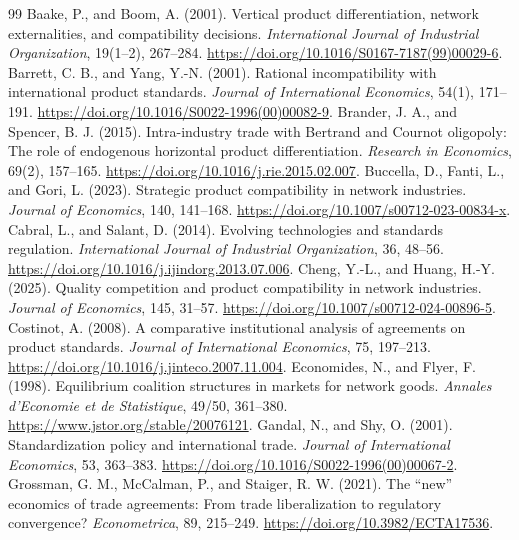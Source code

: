 \documentclass[11pt,a4paper]{article}
\theoremstyle{remark}\newtheorem{remark}[theorem]{Remark}
\begin{document}
\begin{thebibliography}{99}\footnotesize\setlength{\itemsep}{1pt}
 Baake, P., and Boom, A. (2001). Vertical product differentiation, network externalities, and compatibility decisions. \emph{International Journal of Industrial Organization}, 19(1--2), 267--284. \url{https://doi.org/10.1016/S0167-7187(99)00029-6}.
 Barrett, C. B., and Yang, Y.-N. (2001). Rational incompatibility with international product standards. \emph{Journal of International Economics}, 54(1), 171--191. \url{https://doi.org/10.1016/S0022-1996(00)00082-9}.
 Brander, J. A., and Spencer, B. J. (2015). Intra-industry trade with Bertrand and Cournot oligopoly: The role of endogenous horizontal product differentiation. \emph{Research in Economics}, 69(2), 157--165. \url{https://doi.org/10.1016/j.rie.2015.02.007}.
 Buccella, D., Fanti, L., and Gori, L. (2023). Strategic product compatibility in network industries. \emph{Journal of Economics}, 140, 141--168. \url{https://doi.org/10.1007/s00712-023-00834-x}.
 Cabral, L., and Salant, D. (2014). Evolving technologies and standards regulation. \emph{International Journal of Industrial Organization}, 36, 48--56. \url{https://doi.org/10.1016/j.ijindorg.2013.07.006}.
 Cheng, Y.-L., and Huang, H.-Y. (2025). Quality competition and product compatibility in network industries. \emph{Journal of Economics}, 145, 31--57. \url{https://doi.org/10.1007/s00712-024-00896-5}.
 Costinot, A. (2008). A comparative institutional analysis of agreements on product standards. \emph{Journal of International Economics}, 75, 197--213. \url{https://doi.org/10.1016/j.jinteco.2007.11.004}.
 Economides, N., and Flyer, F. (1998). Equilibrium coalition structures in markets for network goods. \emph{Annales d'Economie et de Statistique}, 49/50, 361--380. \url{https://www.jstor.org/stable/20076121}.
 Gandal, N., and Shy, O. (2001). Standardization policy and international trade. \emph{Journal of International Economics}, 53, 363--383. \url{https://doi.org/10.1016/S0022-1996(00)00067-2}.
 Grossman, G. M., McCalman, P., and Staiger, R. W. (2021). The ``new'' economics of trade agreements: From trade liberalization to regulatory convergence? \emph{Econometrica}, 89, 215--249. \url{https://doi.org/10.3982/ECTA17536}.

\end{thebibliography}
\end{document}
